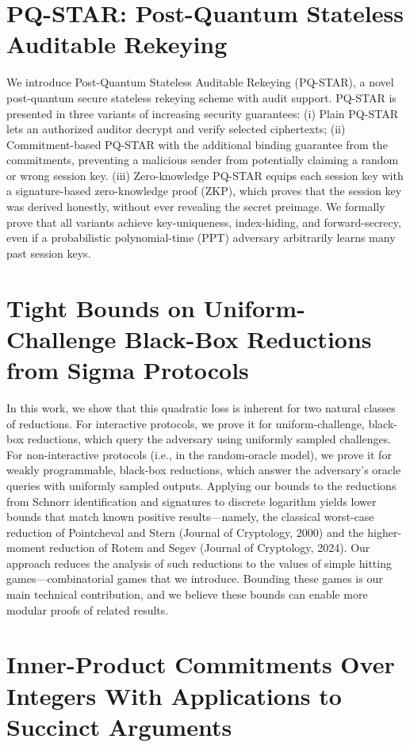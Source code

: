 \documentclass[11pt]{article}
\theoremstyle{definition}
\theoremstyle{remark}
\theoremstyle{plain}
\begin{document}
\section{\cite{cryptoeprint:2025/1489} PQ-STAR: Post-Quantum Stateless Auditable Rekeying} 
We introduce Post-Quantum Stateless Auditable Rekeying (PQ-STAR), a novel post-quantum secure stateless rekeying scheme with audit support. PQ-STAR is presented in three variants of increasing security guarantees: (i) Plain PQ-STAR lets an authorized auditor decrypt and verify selected ciphertexts; (ii) Commitment-based PQ-STAR with the additional binding guarantee from the commitments, preventing a malicious sender from potentially claiming a random or wrong session key. (iii) Zero-knowledge PQ-STAR equips each session key with a signature-based zero-knowledge proof (ZKP), which proves that the session key was derived honestly, without ever revealing the secret preimage. We formally prove that all variants achieve key-uniqueness, index-hiding, and forward-secrecy, even if a probabilistic polynomial-time (PPT) adversary arbitrarily learns many past session keys.

\section{\cite{cryptoeprint:2025/1535} Tight Bounds on Uniform-Challenge Black-Box Reductions from Sigma Protocols}

In this work, we show that this quadratic loss is inherent for two natural classes of reductions. For interactive protocols, we prove it for uniform-challenge, black-box reductions, which query the adversary using uniformly sampled challenges. For non-interactive protocols (i.e., in the random-oracle model), we prove it for weakly programmable, black-box reductions, which answer the adversary’s oracle queries with uniformly sampled outputs. Applying our bounds to the reductions from Schnorr identification and signatures to discrete logarithm yields lower bounds that match known positive results—namely, the classical worst-case reduction of Pointcheval and Stern (Journal of Cryptology, 2000) and the higher-moment reduction of Rotem and Segev (Journal of Cryptology, 2024).
Our approach reduces the analysis of such reductions to the values of simple hitting games—combinatorial games that we introduce. Bounding these games is our main technical contribution, and we believe these bounds can enable more modular proofs of related results.


\section{\cite{cryptoeprint:2025/1536} Inner-Product Commitments Over Integers With Applications to Succinct Arguments}
\end{document}

